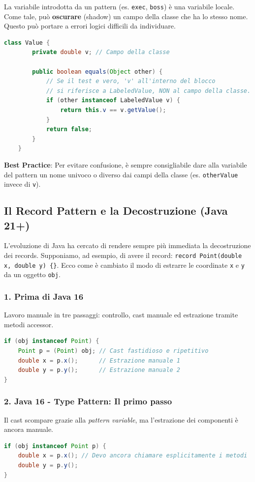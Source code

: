 \begin{warningbox}
    La variabile introdotta da un pattern (es. \texttt{exec}, \texttt{boss}) è una variabile locale. Come tale, può \textbf{oscurare} (shadow) un campo della classe che ha lo stesso nome. Questo può portare a errori logici difficili da individuare.

    \begin{lstlisting}[language=Java, caption={Esempio di Shadowing con instanceof}]
    class Value {
        private double v; // Campo della classe

        public boolean equals(Object other) {
            // Se il test e vero, 'v' all'interno del blocco
            // si riferisce a LabeledValue, NON al campo della classe.
            if (other instanceof LabeledValue v) {
                return this.v == v.getValue(); 
            }
            return false;
        }
    }
    \end{lstlisting}
    \textbf{Best Practice}: Per evitare confusione, è sempre consigliabile dare alla variabile del pattern un nome univoco o diverso dai campi della classe (es. \texttt{otherValue} invece di \texttt{v}).
\end{warningbox}

\subsection{Il Record Pattern e la Decostruzione (Java 21+)}

L'evoluzione di Java ha cercato di rendere sempre più immediata la decostruzione dei records. 
Supponiamo, ad esempio, di avere il record: \texttt{record Point(double x, double y) \{\}}. Ecco come è cambiato il modo di estrarre le coordinate \texttt{x} e \texttt{y} da un oggetto \texttt{obj}.

\subsubsection*{1. Prima di Java 16}
Lavoro manuale in tre passaggi: controllo, cast manuale ed estrazione tramite metodi accessor.
\begin{lstlisting}[language=Java]
if (obj instanceof Point) {
    Point p = (Point) obj; // Cast fastidioso e ripetitivo
    double x = p.x();      // Estrazione manuale 1
    double y = p.y();      // Estrazione manuale 2
}
\end{lstlisting}

\subsubsection*{2. Java 16 - Type Pattern: Il primo passo}
Il cast scompare grazie alla \textit{pattern variable}, ma l'estrazione dei componenti è ancora manuale.
\begin{lstlisting}[language=Java]
if (obj instanceof Point p) {
    double x = p.x(); // Devo ancora chiamare esplicitamente i metodi
    double y = p.y();
}
\end{lstlisting}

